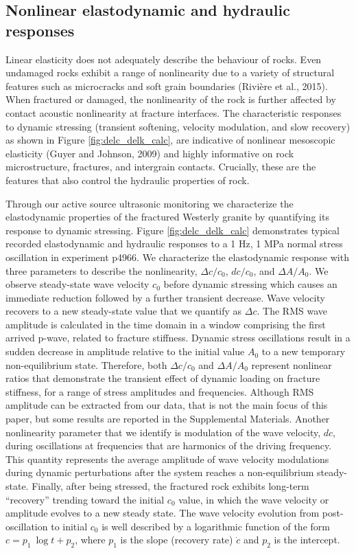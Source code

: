 \documentclass[draft]{agujournal2019}
\begin{document}
\subsection{Nonlinear elastodynamic and hydraulic responses}

Linear elasticity does not adequately describe the behaviour of rocks. Even undamaged rocks exhibit a range of nonlinearity due to a variety of structural features such as microcracks and soft grain boundaries (Rivi\`ere et al., 2015). When fractured or damaged, the nonlinearity of the rock is further affected by contact acoustic nonlinearity at fracture interfaces. The characteristic responses to dynamic stressing (transient softening, velocity modulation, and slow recovery) as shown in Figure \ref{fig:delc_delk_calc}, are indicative of nonlinear mesoscopic elasticity (Guyer and Johnson, 2009) and highly informative on rock microstructure, fractures, and intergrain contacts. Crucially, these are the features that also control the hydraulic properties of rock.


Through our active source ultrasonic monitoring we characterize the elastodynamic properties of the fractured Westerly granite by quantifying its response to dynamic stressing. Figure \ref{fig:delc_delk_calc} demonstrates typical recorded elastodynamic and hydraulic responses to a 1 Hz, 1 MPa normal stress oscillation in experiment p4966. We characterize the elastodynamic response with three parameters to describe the nonlinearity, $ \Delta c/c_0 $, $ dc/c_0 $, and $ \Delta A/A_0 $. We observe steady-state wave velocity $ c_0 $ before dynamic stressing which causes an immediate reduction followed by a further transient decrease. Wave velocity recovers to a new steady-state value that we quantify as  $ \Delta c $.
The RMS wave amplitude is calculated in the time domain in a window comprising the first arrived p-wave, related to fracture stiffness. Dynamic stress oscillations result in a sudden decrease in amplitude relative to the initial value  $ A_0 $ to a new temporary non-equilibrium state. Therefore, both $ \Delta c/c_0 $ and $ \Delta A/A_0 $ represent nonlinear ratios that demonstrate the transient effect of dynamic loading on fracture stiffness, for a range of stress amplitudes and frequencies. Although RMS amplitude can be extracted from our data, that is not the main focus of this paper, but some results are reported in the Supplemental Materials.  
Another nonlinearity parameter that we identify is modulation of the wave velocity, $ dc $, during oscillations at frequencies that are harmonics of the driving frequency. This quantity represents the average amplitude of wave velocity modulations during dynamic perturbations after the system reaches a non-equilibrium steady-state. Finally, after being stressed, the fractured rock exhibits long-term ``recovery'' trending toward the initial $ c_0 $ value, in which the wave velocity or amplitude evolves to a new steady state. The wave velocity evolution from post-oscillation to initial $ c_0 $ is well described by a logarithmic function of the form $ c = p_1\ \log{t} + p_2 $, where $p_1$ is the slope (recovery rate) $ \dot c $ and $p_2$ is the intercept. 
\end{document}
